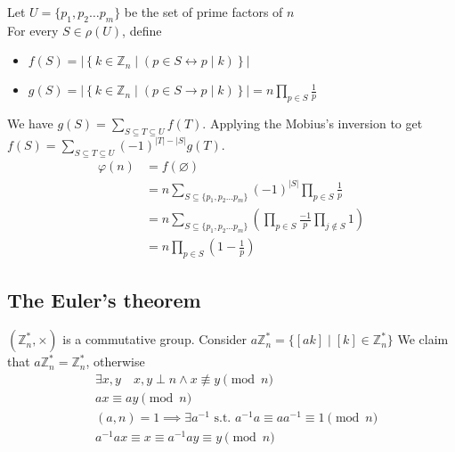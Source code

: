 \documentclass{article}
\newcommand{\ZZ}{\mathbb{Z}}
\begin{document}
Let $U=\{p_1,p_2\ldots p_m\}$ be the set of prime factors of $n$\\
For every $S\in \rho(U)$, define
\begin{itemize}
	\item $f(S)=\left\vert
		      \left\{
		      k\in \ZZ_n
		      \mid
		      (p\in S \leftrightarrow p\mid k)
		      \right\}
		      \right\vert$
	\item $g(S)=\left\vert
		      \left\{
		      k\in \ZZ_n
		      \mid
		      (p\in S \rightarrow p\mid k)
		      \right\}
		      \right\vert=n\prod_{p\in S} \frac{1}{p}$
\end{itemize}

We have $g(S)=\sum_{S\subseteq T\subseteq U} f(T)$.
Applying the Mobius's inversion to get $f(S)=\sum_{S\subseteq T\subseteq U}{(-1)}^{|T|-|S|}g(T)$.\\

$$
	\begin{aligned}
		\varphi(n)
		 & =f(\varnothing)                                                                                        \\
		 & =n\sum_{S\subseteq \{p_1,p_2\ldots p_m\}}{(-1)}^{|S|}\prod_{p \in S}\frac{1}{p}                        \\
		 & =n\sum_{S\subseteq \{p_1,p_2\ldots p_m\}}\left(\prod_{p \in S}\frac{-1}{p} \prod_{j\not\in S} 1\right) \\
		 & =n\prod_{p\in S}(1-\frac{1}{p})
	\end{aligned}
$$


\subsection{The Euler's theorem}

$(\ZZ_n^\ast,\times)$ is a commutative group.
Consider $a\ZZ_n^\ast=\{[ak]\mid [k]\in \ZZ_n^\ast\}$
We claim that $a\ZZ_n^\ast = \ZZ_n^\ast$, otherwise\\

\[
	\begin{aligned}
		 & \exists x,y\quad x,y\perp n\land x\not\equiv y\pmod n                            \\
		 & ax\equiv ay\pmod n                                                               \\
		 & (a,n)=1\implies \exists a^{-1}\text{ s.t. } a^{-1}a\equiv aa^{-1}\equiv 1\pmod n \\
		 & a^{-1}ax\equiv x\equiv a^{-1}ay\equiv y\pmod n
	\end{aligned}
\]
\end{document}
